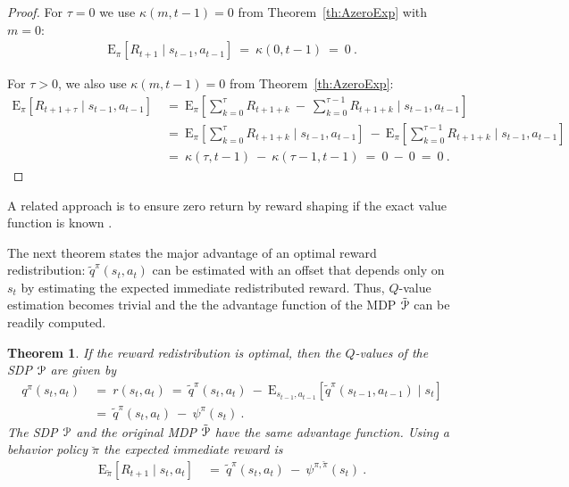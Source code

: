 \documentclass{article}
\newtheorem{theoremA}{Theorem}
\newcommand\EXP{\mathbf{\mathrm{E}}}
\begin{document}
\begin{appendices}
\begin{proof}
For $\tau=0$ we use $\kappa(m,t-1) = 0$ from Theorem~\ref{th:AzeroExp}
with $m=0$:
\begin{align}
  \EXP_{\pi} \left[ R_{t+1}  \mid
  s_{t-1}, a_{t-1} \right] \ = \  \kappa(0,t-1) \ = \ 0 \ . 
\end{align}

For $\tau>0$,
we also use $\kappa(m,t-1) = 0$ from Theorem~\ref{th:AzeroExp}:
\begin{align}
  \EXP_{\pi} \left[ R_{t+1+\tau}  \mid
  s_{t-1}, a_{t-1} \right] \ &= \ 
   \EXP_{\pi} \left[ \sum_{k=0}^{\tau} R_{t+1+k} \ - \ 
    \sum_{k=0}^{\tau-1} R_{t+1+k} \mid
  s_{t-1}, a_{t-1} \right] \\ \nonumber
  &= \    \EXP_{\pi} \left[ \sum_{k=0}^{\tau} R_{t+1+k} \mid
  s_{t-1}, a_{t-1} \right] \ - \ 
    \EXP_{\pi} \left[ \sum_{k=0}^{\tau-1} R_{t+1+k} \mid
  s_{t-1}, a_{t-1} \right] \\ \nonumber
  &= \ \kappa(\tau,t-1) \ - \ \kappa(\tau-1,t-1) \ = \ 0 \ - \ 0 \ = \ 0 \ .
\end{align}

\end{proof}


A related approach is to ensure zero return by 
reward shaping if the exact value function is known \cite{Schulman:15}.


The next theorem states the major advantage of an
optimal reward redistribution:
$\tilde{q}^\pi(s_t,a_t)$ can be estimated with an offset that 
depends only on $s_t$ 
by estimating the expected immediate redistributed reward.
Thus, $Q$-value estimation becomes trivial and the
the advantage function of the MDP $\tilde{\mathcal{P}}$ can be readily computed.
\begin{theoremA}
\label{th:AOptReturnDecomp}
If the reward redistribution is 
optimal, then the $Q$-values 
of the SDP $\mathcal{P}$ are given by 
\begin{align}
\label{eq:Aqvalue}
   q^\pi(s_t,a_t) \ &= \   r(s_t,a_t) \ = \  
   \tilde{q}^\pi(s_t,a_t) \ - \ 
    \EXP_{s_{t-1},a_{t-1}} \left[ \tilde{q}^\pi(s_{t-1},a_{t-1}) \mid s_t \right] \\ \nonumber
    &= \ \tilde{q}^\pi(s_t,a_t) \ - \ \psi^\pi(s_t) \ .
\end{align} 
The SDP $\mathcal{P}$ and the original MDP $\tilde{\mathcal{P}}$ 
have the same advantage function.
Using a behavior policy 
$\breve{\pi}$ the expected immediate reward is
\begin{align}
\label{eq:Abehavior}
   \EXP_{\breve{\pi}} \left[ R_{t+1} \mid s_t,a_t \right] \ &= \
    \tilde{q}^\pi(s_t,a_t) \ - \ \psi^{\pi,\breve{\pi}}(s_t) \ .
  \end{align}
\end{theoremA}



\end{appendices}
\end{document}
